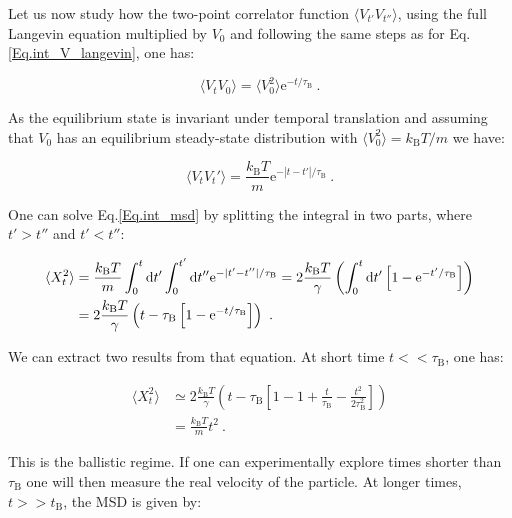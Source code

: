 Let us now study how the two-point correlator function $ \langle V_{t'}V_{t''} \rangle $, using the full Langevin equation multiplied by $V_0$ and following the same steps as for Eq.\ref{Eq.int_V_langevin}, one  has:

\begin{equation}
	\langle V_t V_0 \rangle = \langle V_0 ^2 \rangle \mathrm{e}^{-t/\tau_{\mathrm{B}}}~.
\end{equation}

As the equilibrium state is invariant under temporal translation and assuming that $V_0$ has an equilibrium steady-state distribution with $\langle V_0^2 \rangle = k_\mathrm{B} T / m$ we have:

\begin{equation}
	\langle V_t V_t' \rangle = \frac{k_\mathrm{B}T}{m} \mathrm{e}^{-|t-t'|/\tau_{\mathrm{B}}}~.
\end{equation}

One can solve Eq.\ref{Eq.int_msd} by splitting the integral in two parts, where $t'>t''$ and $ t' < t''$:

\begin{equation}
	\begin{aligned}
	\langle X_t ^2 \rangle & =    \frac{k_\mathrm{B}T}{m}  \int _0 ^t \textnormal{d}t' \int _0 ^{t'} \textnormal{d}t'' \mathrm{e} ^ {- |t' - t''| / \tau_\mathrm{B}} = 2 \frac{k_\mathrm{B}T}{\gamma} \left( \int_0 ^t \textnormal{d}t' \left[1 - \mathrm{e}^{-t'/\tau_\mathrm{B}} \right] \right) \\
	& = 2 \frac{k_\mathrm{B} T}{\gamma} \left( t - \tau_\mathrm{B} \left[ 1 - \mathrm{e}^{-t/\tau_\mathrm{B}} \right] \right) ~.
	\end{aligned}
\end{equation}

We can extract two results from that equation. At short time $t << \tau_\mathrm{B}$, one has:

\begin{equation}
	\begin{aligned}
	\langle X_t ^2 \rangle & \simeq  2 \frac{k_\mathrm{B} T}{\gamma} \left( t - \tau_\mathrm{B} \left[ 1 - 1 + \frac{t}{\tau_\mathrm{B}} - \frac{t^2}{ 2 \tau_\mathrm{B} ^2}\right]         \right) \\
	& = \frac{k_\mathrm{B} T}{m} t^2 ~.
	\end{aligned}
	\label{Eq.shorttimemsd}
\end{equation}

This is the ballistic regime. If one can experimentally explore times shorter than $\tau _ \mathrm{B} $ one will then measure the real velocity of the particle. At longer times, $t >> t_\mathrm{B}$, the \gls{MSD} is given by:

